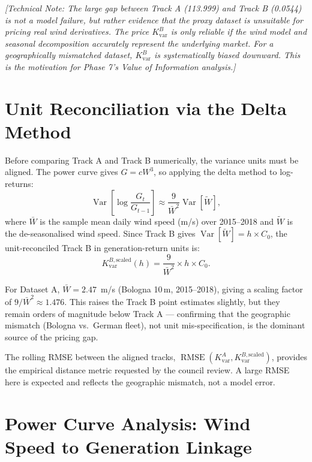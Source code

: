 \documentclass[11pt, a4paper, twoside]{article}
\begin{document}
\textit{[Technical Note: The large gap between Track A (113.999) and Track B (0.0544) is \textit{not} a model failure, but rather evidence that the proxy dataset is unsuitable for pricing real wind derivatives. The price $K_{\text{var}}^B$ is only reliable if the wind model and seasonal decomposition accurately represent the underlying market. For a geographically mismatched dataset, $K_{\text{var}}^B$ is systematically biased downward. This is the motivation for Phase 7's Value of Information analysis.]}

\section{Unit Reconciliation via the Delta Method}
\label{sec:unit_reconciliation}

Before comparing Track A and Track B numerically, the variance units must be aligned. The power curve gives $G = c W^3$, so applying the delta method to log-returns:
\begin{equation}
  \operatorname{Var}\!\left[\log\frac{G_t}{G_{t-1}}\right] \approx \frac{9}{\bar{W}^2} \operatorname{Var}[\tilde{W}],
\end{equation}
where $\bar{W}$ is the sample mean daily wind speed (m/s) over 2015--2018 and $\tilde{W}$ is the de-seasonalised wind speed. Since Track B gives $\operatorname{Var}[\tilde{W}] = h \times C_0$, the unit-reconciled Track B in generation-return units is:
\begin{equation}
  K_{\text{var}}^{B,\text{scaled}}(h) = \frac{9}{\bar{W}^2} \times h \times C_0.
\end{equation}

For Dataset A, $\bar{W} = 2.47$~m/s (Bologna 10\,m, 2015--2018), giving a scaling factor of $9/\bar{W}^2 \approx 1.476$. This raises the Track B point estimates slightly, but they remain orders of magnitude below Track A — confirming that the geographic mismatch (Bologna vs.\ German fleet), not unit mis-specification, is the dominant source of the pricing gap.

The rolling RMSE between the aligned tracks, $\operatorname{RMSE}(K_{\text{var}}^A, K_{\text{var}}^{B,\text{scaled}})$, provides the empirical distance metric requested by the council review. A large RMSE here is expected and reflects the geographic mismatch, not a model error.

\section{Power Curve Analysis: Wind Speed to Generation Linkage}
\label{sec:power_curve}
\end{document}
